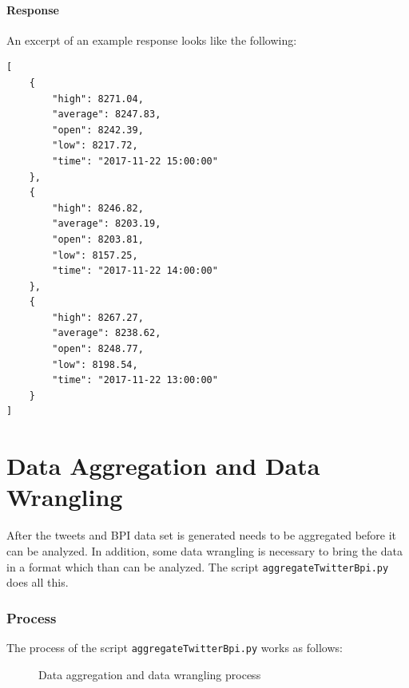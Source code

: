 \documentclass[a4paper,12pt]{article}
\begin{document}
\begin{spacing}{1.2}
\paragraph{Response}
An excerpt of an example response looks like the following:
\begin{lstlisting}
[
    {
        "high": 8271.04, 
        "average": 8247.83, 
        "open": 8242.39,
        "low": 8217.72, 
        "time": "2017-11-22 15:00:00"
    }, 
    {
        "high": 8246.82,
        "average": 8203.19,
        "open": 8203.81,
        "low": 8157.25,
        "time": "2017-11-22 14:00:00"
    }, 
    {
        "high": 8267.27, 
        "average": 8238.62, 
        "open": 8248.77, 
        "low": 8198.54, 
        "time": "2017-11-22 13:00:00"
    }
]
\end{lstlisting}


\section{Data Aggregation and Data Wrangling}
After the tweets and BPI data set is generated needs to be aggregated before it can be analyzed. In addition, some data wrangling is necessary to bring the data in a format which than can be analyzed. The script \verb|aggregateTwitterBpi.py| does all this.

\subsubsection{Process}
The process of the script \verb|aggregateTwitterBpi.py| works as follows:
\begin{figure}[H]
    \centering
    \caption{Data aggregation and data wrangling process} \label{fig:dataaggregation}
\end{figure}


\end{spacing}
\end{document}
